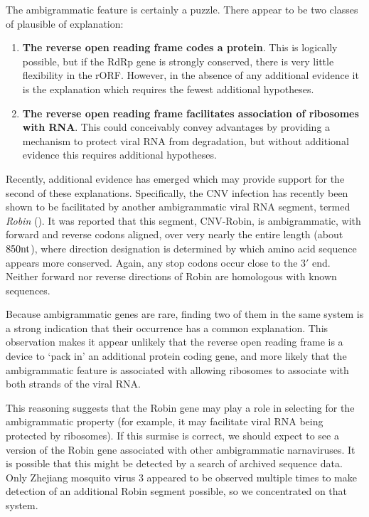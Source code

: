\documentclass[unnumsec,webpdf,contemporary,large,namedate]{oup-authoring-template}%
\theoremstyle{thmstyleone}%
\theoremstyle{thmstyletwo}%
\theoremstyle{thmstylethree}%
\begin{document}
The ambigrammatic feature is certainly a puzzle. There appear to be two classes
of plausible of explanation:

\begin{enumerate}

\item {\bf The reverse open reading frame codes a protein}. This is logically possible, but
if the RdRp gene is strongly conserved, there is very little flexibility in the rORF. However, in the
absence of any additional evidence it is the explanation which requires the fewest additional hypotheses.

\item {\bf The reverse open reading frame facilitates association of ribosomes with RNA}. This
could conceivably convey advantages by providing a mechanism to protect viral RNA from
degradation, but without additional evidence this requires additional hypotheses.

\end{enumerate}

Recently, additional evidence has emerged which may provide support for the second of these explanations.
Specifically, the CNV infection has recently been shown to be facilitated by another ambigrammatic viral
RNA segment, termed \emph{Robin} (\cite{Bat+20,Ret+20}). It was reported that this segment, CNV-Robin,
is ambigrammatic, with forward and reverse codons aligned, over very nearly
the entire length (about $850{\rm nt}$), where direction designation is determined by which amino acid sequence appears more conserved. Again, any stop codons occur close to the $3'$ end.
Neither forward nor reverse directions of Robin are homologous with known sequences.

Because ambigrammatic genes are rare, finding two of them in the same system is a strong
indication that their occurrence has a common explanation. This observation makes it
appear unlikely that the reverse open reading frame is a device to \lq pack in' an additional
protein coding gene, and more likely that the ambigrammatic feature is associated with
allowing ribosomes to associate with both strands of the viral RNA.

This reasoning suggests that the Robin gene may play a role in selecting for the
ambigrammatic property (for example, it may facilitate viral RNA being protected
by ribosomes). If this surmise is correct, we should expect to see a version of the Robin
gene associated with other ambigrammatic narnaviruses. It is possible that this might be detected
by a search of archived sequence data. Only Zhejiang mosquito virus 3 appeared to
be observed multiple times to make detection of an additional Robin segment possible, so we
concentrated on that system.
\end{document}
